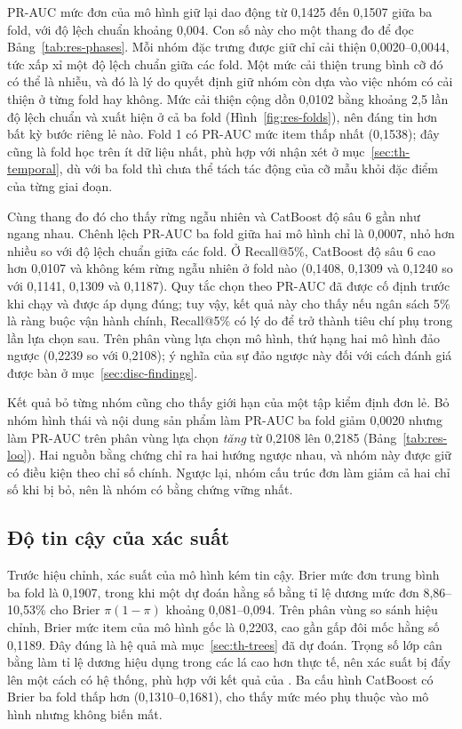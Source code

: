 \documentclass[12pt,a4paper]{report}
\begin{document}
PR-AUC mức đơn của mô hình giữ lại dao động từ 0,1425 đến 0,1507 giữa ba fold, với độ lệch chuẩn khoảng 0,004. Con số này cho một thang đo để đọc Bảng~\ref{tab:res-phases}. Mỗi nhóm đặc trưng được giữ chỉ cải thiện 0,0020--0,0044, tức xấp xỉ một độ lệch chuẩn giữa các fold. Một mức cải thiện trung bình cỡ đó có thể là nhiễu, và đó là lý do quyết định giữ nhóm còn dựa vào việc nhóm có cải thiện ở từng fold hay không. Mức cải thiện cộng dồn 0,0102 bằng khoảng 2,5 lần độ lệch chuẩn và xuất hiện ở cả ba fold (Hình~\ref{fig:res-folds}), nên đáng tin hơn bất kỳ bước riêng lẻ nào. Fold 1 có PR-AUC mức item thấp nhất (0,1538); đây cũng là fold học trên ít dữ liệu nhất, phù hợp với nhận xét ở mục~\ref{sec:th-temporal}, dù với ba fold thì chưa thể tách tác động của cỡ mẫu khỏi đặc điểm của từng giai đoạn.

Cùng thang đo đó cho thấy rừng ngẫu nhiên và CatBoost độ sâu 6 gần như ngang nhau. Chênh lệch PR-AUC ba fold giữa hai mô hình chỉ là 0,0007, nhỏ hơn nhiều so với độ lệch chuẩn giữa các fold. Ở Recall@5\%, CatBoost độ sâu 6 cao hơn 0,0107 và không kém rừng ngẫu nhiên ở fold nào (0,1408, 0,1309 và 0,1240 so với 0,1141, 0,1309 và 0,1187). Quy tắc chọn theo PR-AUC đã được cố định trước khi chạy và được áp dụng đúng; tuy vậy, kết quả này cho thấy nếu ngân sách 5\% là ràng buộc vận hành chính, Recall@5\% có lý do để trở thành tiêu chí phụ trong lần lựa chọn sau. Trên phân vùng lựa chọn mô hình, thứ hạng hai mô hình đảo ngược (0,2239 so với 0,2108); ý nghĩa của sự đảo ngược này đối với cách đánh giá được bàn ở mục~\ref{sec:disc-findings}.

Kết quả bỏ từng nhóm cũng cho thấy giới hạn của một tập kiểm định đơn lẻ. Bỏ nhóm hình thái và nội dung sản phẩm làm PR-AUC ba fold giảm 0,0020 nhưng làm PR-AUC trên phân vùng lựa chọn \emph{tăng} từ 0,2108 lên 0,2185 (Bảng~\ref{tab:res-loo}). Hai nguồn bằng chứng chỉ ra hai hướng ngược nhau, và nhóm này được giữ có điều kiện theo chỉ số chính. Ngược lại, nhóm cấu trúc đơn làm giảm cả hai chỉ số khi bị bỏ, nên là nhóm có bằng chứng vững nhất.

\subsection{Độ tin cậy của xác suất}\label{sec:analysis-calibration}

Trước hiệu chỉnh, xác suất của mô hình kém tin cậy. Brier mức đơn trung bình ba fold là 0,1907, trong khi một dự đoán hằng số bằng tỉ lệ dương mức đơn 8,86--10,53\% cho Brier $\pi(1-\pi)$ khoảng 0,081--0,094. Trên phân vùng so sánh hiệu chỉnh, Brier mức item của mô hình gốc là 0,2203, cao gần gấp đôi mốc hằng số 0,1189. Đây đúng là hệ quả mà mục~\ref{sec:th-trees} đã dự đoán. Trọng số lớp cân bằng làm tỉ lệ dương hiệu dụng trong các lá cao hơn thực tế, nên xác suất bị đẩy lên một cách có hệ thống, phù hợp với kết quả của \textcite{vandengoorbergh2022}. Ba cấu hình CatBoost có Brier ba fold thấp hơn (0,1310--0,1681), cho thấy mức méo phụ thuộc vào mô hình nhưng không biến mất.
\end{document}
